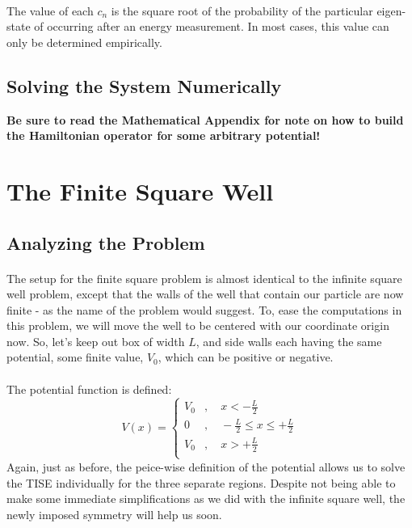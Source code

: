 \documentclass[12pt,letterpaper]{book}
\begin{document}
\paragraph*{}The value of each $c_n$ is the square root of the probability of the particular eigen-state of occurring after an energy measurement. In most cases, this value can only be determined empirically.


\subsection*{Solving the System Numerically}
\textbf{Be sure to read the Mathematical Appendix for note on how to build the Hamiltonian operator for some arbitrary potential!}



\section{The Finite Square Well}


\subsection*{Analyzing the Problem}
\paragraph*{}The setup for the finite square problem is almost identical to the infinite square well problem, except that the walls of the well that contain our particle are now finite - as the name of the problem would suggest. To, ease the computations in this problem, we will move the well to be centered with our coordinate origin now. So, let's keep out box of width $L$, and side walls each having the same potential, some finite value, $V_0$, which can be positive or negative.
\paragraph*{}The potential function is defined:
\begin{equation}
\label{FSW potential}
V(x) = \left\{
        \begin{array}{ll}
            V_0 &, \quad x < -\frac{L}{2} \\
            0 		&, \quad -\frac{L}{2} \leq x \leq +\frac{L}{2} \\
            V_0 &, \quad x > +\frac{L}{2} \\
        \end{array}
    \right.
\end{equation}
Again, just as before, the peice-wise definition of the potential allows us to solve the TISE individually for the three separate regions. Despite not being able to make some immediate simplifications as we did with the infinite square well, the newly imposed symmetry will help us soon.
\end{document}
